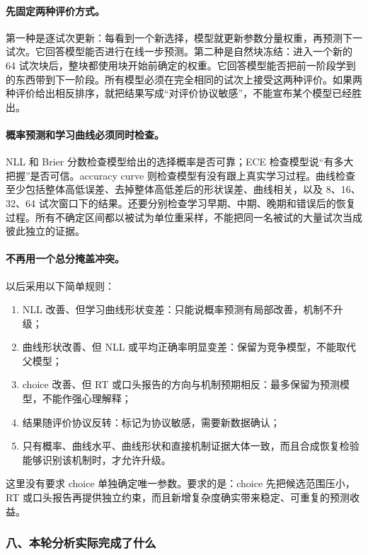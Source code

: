 \paragraph{先固定两种评价方式。}
第一种是逐试次更新：每看到一个新选择，模型就更新参数分量权重，再预测下一试次。它回答模型能否进行在线一步预测。第二种是自然块冻结：进入一个新的 64 试次块后，整块都使用块开始前确定的权重。它回答模型能否把前一阶段学到的东西带到下一阶段。所有模型必须在完全相同的试次上接受这两种评价。如果两种评价给出相反排序，就把结果写成“对评价协议敏感”，不能宣布某个模型已经胜出。

\paragraph{概率预测和学习曲线必须同时检查。}
NLL 和 Brier 分数检查模型给出的选择概率是否可靠；ECE 检查模型说“有多大把握”是否可信。accuracy curve 则检查模型有没有跟上真实学习过程。曲线检查至少包括整体高低误差、去掉整体高低差后的形状误差、曲线相关，以及 8、16、32、64 试次窗口下的结果。还要分别检查学习早期、中期、晚期和错误后的恢复过程。所有不确定区间都以被试为单位重采样，不能把同一名被试的大量试次当成彼此独立的证据。

\paragraph{不再用一个总分掩盖冲突。}
以后采用以下简单规则：
\begin{enumerate}
    \item NLL 改善、但学习曲线形状变差：只能说概率预测有局部改善，机制不升级；
    \item 曲线形状改善、但 NLL 或平均正确率明显变差：保留为竞争模型，不能取代父模型；
    \item choice 改善、但 RT 或口头报告的方向与机制预期相反：最多保留为预测模型，不能作强心理解释；
    \item 结果随评价协议反转：标记为协议敏感，需要新数据确认；
    \item 只有概率、曲线水平、曲线形状和直接机制证据大体一致，而且合成恢复检验能够识别该机制时，才允许升级。
\end{enumerate}
这里没有要求 choice 单独确定唯一参数。要求的是：choice 先把候选范围压小，RT 或口头报告再提供独立约束，而且新增复杂度确实带来稳定、可重复的预测收益。


\subsubsection{八、本轮分析实际完成了什么}

